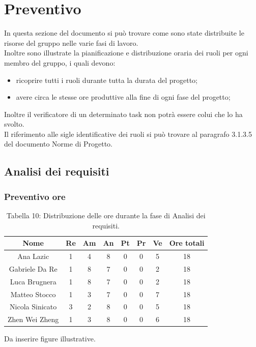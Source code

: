 \section{Preventivo}
In questa sezione del documento si può trovare come sono state distribuite le risorse del gruppo nelle varie fasi di lavoro.\\
Inoltre sono illustrate la pianificazione e distribuzione oraria dei ruoli per ogni membro del gruppo, i quali devono:
\begin{itemize}
	\item ricoprire tutti i ruoli durante tutta la durata del progetto;
	\item avere circa le stesse ore produttive alla fine di ogni fase del progetto;
\end{itemize}
Inoltre il verificatore di un determinato task non potrà essere colui che lo ha svolto.\\
Il riferimento alle sigle identificative dei ruoli si può trovare al paragrafo 3.1.3.5 del documento Norme di Progetto.

\subsection{Analisi dei requisiti}
\subsubsection{Preventivo ore}
\begin{table}[h]
	\setlength\extrarowheight{5pt}
	\centering
	\begin{tabularx}{\textwidth}{|c|c|c|c|c|c|c|c|}
		\hline
		\textbf{Nome} & \textbf{Re} & \textbf{Am} & \textbf{An} & \textbf{Pt} & \textbf{Pr}& \textbf{Ve} & \textbf{Ore totali} \\
		\hline
		Ana Lazic &1&4&8&0&0&5&18 \\
		\hline
		Gabriele Da Re &1&8&7&0&0&2&18 \\
		\hline
		Luca Brugnera &1&8&7&0&0&2&18 \\
		\hline
		Matteo Stocco &1&3&7&0&0&7&18 \\
		\hline
		Nicola Sinicato &3&2&8&0&0&5&18 \\
		\hline
		Zhen Wei Zheng &1&3&8&0&0&6&18 \\
		\hline
	\end{tabularx}
	\vspace{10pt}
	\caption{Tabella 10: Distribuzione delle ore durante la fase di Analisi dei requisiti.}
\end{table}
Da inserire figure illustrative.

